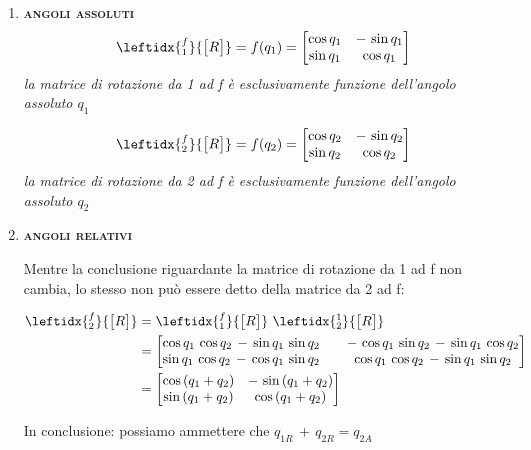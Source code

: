 			\begin{enumerate}[$\rightarrow$]
				\item {\scshape{\bfseries angoli assoluti}}
					\begin{equation*}
						\leftidx{^f_1}{\begin{bmatrix}R\end{bmatrix}} = f (q_1) =
						\begin{bmatrix}
							\cos{q_1} & -\,\sin{q_1}\\
							\sin{q_1} & \cos{q_1}
						\end{bmatrix}
						\end{equation*}
						\emph{la matrice di rotazione da 1 ad f è esclusivamente funzione dell'angolo assoluto $q_1$}
						
						
						\begin{equation*}
						\leftidx{^f_2}{\begin{bmatrix}R\end{bmatrix}} = f (q_2) =
						\begin{bmatrix}
							\cos{q_2} & -\,\sin{q_2}\\
							\sin{q_2} & \cos{q_2}
						\end{bmatrix}
					\end{equation*}
					\emph{la matrice di rotazione da 2 ad f è esclusivamente funzione dell'angolo assoluto $q_2$}
				
				\item  {\scshape{\bfseries angoli relativi}}
				
					Mentre la conclusione riguardante la matrice di rotazione da 1 ad f non cambia, lo stesso non può essere detto della matrice da 2 ad f:
					
					\begin{align*}
						\leftidx{^f_2}{\begin{bmatrix}R\end{bmatrix}} &=
						\leftidx{^f_1}{\begin{bmatrix}R\end{bmatrix}}\,\,
						\leftidx{^1_2}{\begin{bmatrix}R\end{bmatrix}}\\
						&= \begin{bmatrix}
						\cos{q_1}\,\cos{q_2}\,-\,\sin{q_1}\,\sin{q_2} \quad & -\,\cos{q_1}\,\sin{q_2}\,-\,\sin{q_1}\,\cos{q_2}\\
						\sin{q_1}\,\cos{q_2}\,-\,\cos{q_1}\,\sin{q_2} \quad & \cos{q_1}\,\cos{q_2}\,-\,\sin{q_1}\,\sin{q_2}
						\end{bmatrix}\\
						&= \begin{bmatrix}
						\cos{(q_1 + q_2)} & -\,\sin{(q_1 + q_2)}\\
						\sin{(q_1 + q_2)} & \cos{(q_1 + q_2)}
						\end{bmatrix}
					\end{align*}
					
					In conclusione: possiamo ammettere che $q_{1R}\,+\,q_{2R} = q_{2A}$				
			\end{enumerate}
			 
